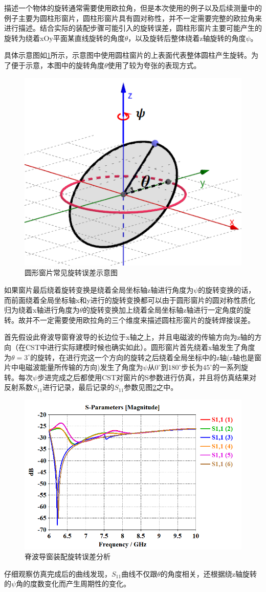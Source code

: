 \documentclass[master]{thesis-uestc}
\begin{document}
描述一个物体的旋转通常需要使用欧拉角，但是本次使用的例子以及后续测量中的例子主要为圆柱形窗片，圆柱形窗片具有圆对称性，并不一定需要完整的欧拉角来进行描述。结合实际的装配步骤可能引入的旋转误差，圆柱形窗片主要可能产生的旋转为绕着xOy平面某直线旋转的角度\(\theta\)，以及旋转后整体绕着z轴旋转的角度\(\psi\)。

具体示意图如\ref{fig:旋转示意图}所示，示意图中使用圆柱窗片的上表面代表整体圆柱产生旋转。为了便于示意，本图中的旋转角度\(\theta\)使用了较为夸张的表现方式。
\begin{figure}[!htb]
    \centering
    \includegraphics[width=0.25\linewidth]{pic/chapter5/窗片旋转角示意图.png}
    \caption{圆形窗片常见旋转误差示意图}
    \label{fig:旋转示意图}
\end{figure}
如果窗片最后绕着旋转变换是绕着全局坐标轴z轴进行角度为$\psi$的旋转变换的话，而前面绕着全局坐标轴x和y进行的旋转变换都可以由于圆形窗片的圆对称性质化归为绕着x轴进行角度为$\theta$的旋转变换加上绕着全局坐标轴z轴进行一定角度的旋转。故并不一定需要使用欧拉角的三个维度来描述圆柱形窗片的旋转焊接误差。

首先假设此脊波导窗脊波导的长边位于x轴之上，并且电磁波的传输方向为z轴的方向（在CST中进行实际建模时候也确实如此）。圆形窗片首先绕着x轴发生了角度为$\theta=3^ \circ $的旋转，在进行完这一个方向的旋转之后绕着全局坐标中的z轴(z轴也是窗片中电磁波能量所传输的方向)发生了角度为$\psi$从$0^ \circ$到$180^ \circ$步长为$45^ \circ$的一系列旋转。每次$\psi $步进完成之后都使用CST对窗片的S参数进行仿真，并且将仿真结果对反射系数$S_{11}$进行记录，最后记录的$S_{11}$参数见图\ref{fig:脊波导圆窗旋转}之中。
\begin{figure}[!htb]
    \centering
    \includegraphics[width=0.5\linewidth]{pic/chapter5/脊波导圆窗旋转.png}
    \caption{脊波导窗装配旋转误差分析}
    \label{fig:脊波导圆窗旋转}
\end{figure}
仔细观察仿真完成后的曲线发现，$S_{11}$曲线不仅跟\(\theta\)的角度相关，还根据绕z轴旋转的$\psi$角的度数变化而产生周期性的变化。
\end{document}
